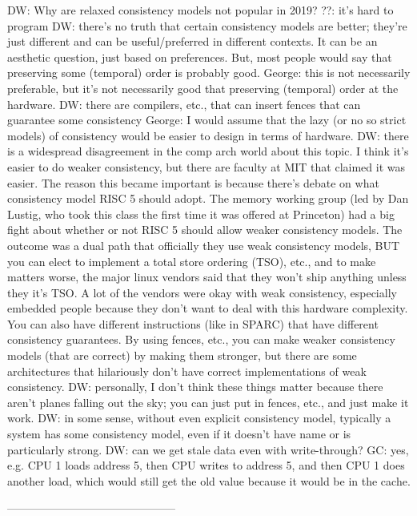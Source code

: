 DW: Why are relaxed consistency models not popular in 2019?
??: it's hard to program
DW: there's no truth that certain consistency models are better; they're just different and can be useful/preferred in different contexts. It can be an aesthetic question, just based on preferences.
But, most people would say that preserving some (temporal) order is probably good.
George: this is not necessarily preferable, but it's not necessarily good that preserving (temporal) order at the hardware.
DW: there are compilers, etc., that can insert fences that can guarantee some consistency
George: I would assume that the lazy (or no so strict models) of consistency would be easier to design in terms of hardware.
DW: there is a widespread disagreement in the comp arch world about this topic. I think it's easier to do weaker consistency, but there are faculty at MIT that claimed it was easier.
The reason this became important is because there's debate on what consistency model RISC 5 should adopt.
The memory working group (led by Dan Lustig, who took this class the first time it was offered at Princeton) had a big fight about whether or not RISC 5 should allow weaker consistency models.
The outcome was a dual path that officially they use weak consistency models, BUT you can elect to implement a total store ordering (TSO), etc., and to make matters worse, the major linux vendors said that they won't ship anything unless they it's TSO.
A lot of the vendors were okay with weak consistency, especially embedded people because they don't want to deal with this hardware complexity.
You can also have different instructions (like in SPARC) that have different consistency guarantees.
By using fences, etc., you can make weaker consistency models (that are correct) by making them stronger, but there are some architectures that hilariously don't have correct implementations of weak consistency.
DW: personally, I don't think these things matter because there aren't planes falling out the sky; you can just put in fences, etc., and just make it work.
DW: in some sense, without even explicit consistency model, typically a system has some consistency model, even if it doesn't have name or is particularly strong.
DW: can we get stale data even with write-through?
GC: yes, e.g. CPU 1 loads address 5, then CPU writes to address 5, and then CPU 1 does another load, which would still get the old value because it would be in the cache.

---------------------------------------------

